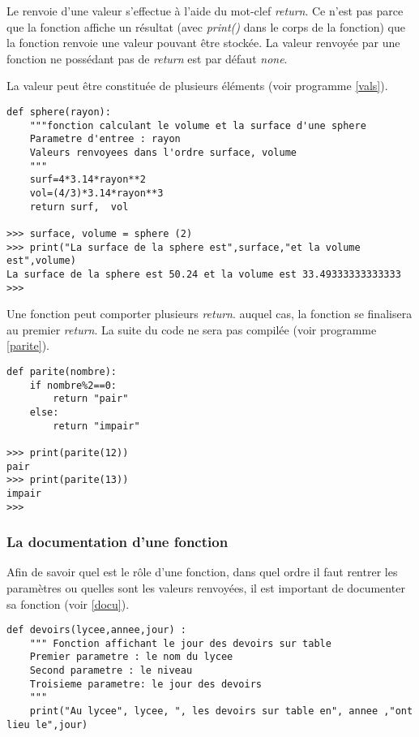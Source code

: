Le renvoie d'une valeur s'effectue à l'aide du mot-clef \textit{return}. Ce n'est pas parce que la fonction affiche un résultat (avec \textit{print()} dans le corps de la fonction) que la fonction renvoie une valeur pouvant être stockée.
La valeur renvoyée par une fonction ne possédant pas de \textit{return} est par défaut \textit{none}.

La valeur peut être constituée de plusieurs éléments (voir programme \ref{vals}).

\begin{lstlisting}[frame=lines,caption={une fonction renvoyant plusieurs valeurs},label=vals]
def sphere(rayon):
    """fonction calculant le volume et la surface d'une sphere
    Parametre d'entree : rayon
    Valeurs renvoyees dans l'ordre surface, volume
    """
    surf=4*3.14*rayon**2
    vol=(4/3)*3.14*rayon**3
    return surf,  vol

>>> surface, volume = sphere (2)
>>> print("La surface de la sphere est",surface,"et la volume est",volume)
La surface de la sphere est 50.24 et la volume est 33.49333333333333
>>> 
\end{lstlisting}

Une fonction peut comporter plusieurs \textit{return}. auquel cas, la fonction se finalisera au premier \textit{return}. La suite du code ne sera pas compilée (voir programme \ref{parite}).

\begin{lstlisting}[frame=lines,caption={une fonction avec plusieurs \textit{return}},label=parite]
def parite(nombre):
    if nombre%2==0:
        return "pair"
    else:
        return "impair"
        
>>> print(parite(12))
pair
>>> print(parite(13))
impair
>>> 
\end{lstlisting}

\subsubsection{La documentation d'une fonction}

Afin de savoir quel est le rôle d'une fonction, dans quel ordre il faut rentrer les paramètres ou quelles sont les valeurs renvoyées, il est important de documenter sa fonction (voir \ref{docu}).

\begin{lstlisting}[frame=lines,caption={l'usage des paramètres},label=docu]
def devoirs(lycee,annee,jour) :
    """ Fonction affichant le jour des devoirs sur table
    Premier parametre : le nom du lycee
    Second parametre : le niveau
    Troisieme parametre: le jour des devoirs
    """
    print("Au lycee", lycee, ", les devoirs sur table en", annee ,"ont lieu le",jour)
    
  

    
\end{lstlisting}

